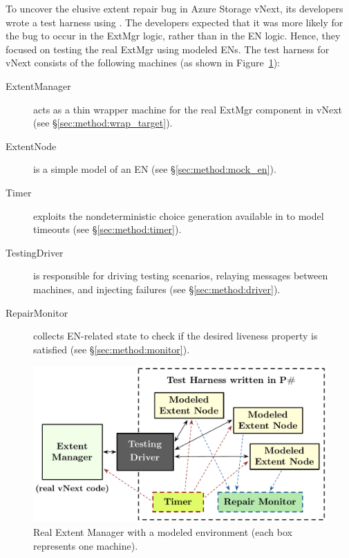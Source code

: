 To uncover the elusive extent repair bug in Azure Storage vNext, its developers wrote a test harness using \psharp. The developers expected that it was more likely for the bug to occur in the ExtMgr logic, rather than in the EN logic. Hence, they focused on testing the real ExtMgr using modeled ENs. The test harness for vNext consists of the following \psharp machines (as shown in Figure~\ref{fig:azurestoremodel}):
\begin{description}
\item[ExtentManager] acts as a thin wrapper machine for the real ExtMgr component in vNext (see \S\ref{sec:method:wrap_target}).

\item[ExtentNode] is a simple model of an EN (see \S\ref{sec:method:mock_en}).

\item[Timer] exploits the nondeterministic choice generation available in \psharp to model timeouts (see \S\ref{sec:method:timer}).

\item[TestingDriver] is responsible for driving testing scenarios, relaying messages between machines, and injecting failures (see \S\ref{sec:method:driver}).

\item[RepairMonitor] collects EN-related state to check if the desired liveness property is satisfied (see \S\ref{sec:method:monitor}).
\end{description}

\begin{figure}[t]
\centering
\includegraphics[width=\linewidth]{img/mocked_vnext}
\caption{Real Extent Manager with a modeled environment (each box represents one \psharp machine).}
\label{fig:azurestoremodel}
\vspace{-2mm}
\end{figure}

